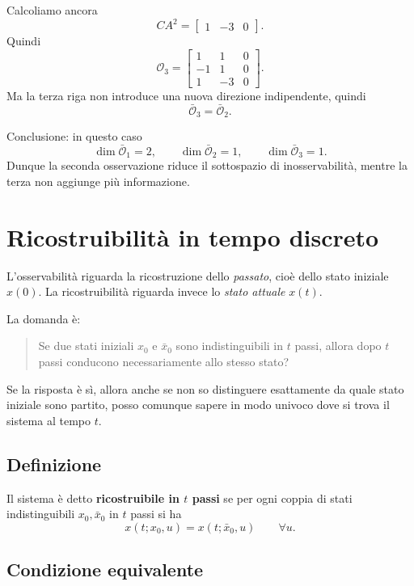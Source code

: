Calcoliamo ancora
\[
CA^2=
\begin{bmatrix}
1 & -3 & 0
\end{bmatrix}.
\]
Quindi
\[
\mathcal O_3=
\begin{bmatrix}
1 & 1 & 0\\
-1 & 1 & 0\\
1 & -3 & 0
\end{bmatrix}.
\]
Ma la terza riga non introduce una nuova direzione indipendente, quindi
\[
\bar{\mathcal O}_3=\bar{\mathcal O}_2.
\]

\medskip

Conclusione: in questo caso
\[
\dim \bar{\mathcal O}_1=2,\qquad
\dim \bar{\mathcal O}_2=1,\qquad
\dim \bar{\mathcal O}_3=1.
\]
Dunque la seconda osservazione riduce il sottospazio di inosservabilità, mentre la terza non aggiunge più informazione.

\section{Ricostruibilità in tempo discreto}

L'osservabilità riguarda la ricostruzione dello \emph{passato}, cioè dello stato iniziale \(x(0)\).  
La ricostruibilità riguarda invece lo \emph{stato attuale} \(x(t)\).

\medskip

La domanda è:

\begin{quote}
Se due stati iniziali \(x_0\) e \(\bar x_0\) sono indistinguibili in \(t\) passi, allora dopo \(t\) passi conducono necessariamente allo stesso stato?
\end{quote}

Se la risposta è sì, allora anche se non so distinguere esattamente da quale stato iniziale sono partito, posso comunque sapere in modo univoco dove si trova il sistema al tempo \(t\).

\subsection{Definizione}

Il sistema è detto \textbf{ricostruibile in \(t\) passi} se per ogni coppia di stati indistinguibili \(x_0,\bar x_0\) in \(t\) passi si ha
\[
x(t;x_0,u)=x(t;\bar x_0,u)
\qquad
\forall u.
\]

\subsection{Condizione equivalente}

